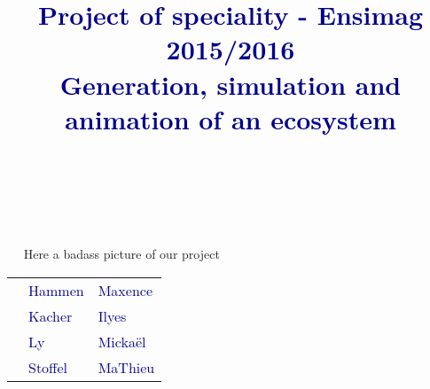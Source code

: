 \documentclass[a4paper,12pt,twoside]{article}
\title{\textbf{{\textcolor{darkblue}{{\Huge Project of speciality - Ensimag 2015/2016}\\[2cm] {\huge Generation, simulation and animation of an ecosystem}}}}}
\author{\large \textbf{{\textcolor{darkblue}{}}}}
\date{\Large \textbf{\textcolor{darkblue}{}}}
\begin{document}
	\begin{spacing}{1.3}%
	\setcounter{page}{1}
	\begin{center}
	~~\\
	\vspace{0cm}
	
	\begin{minipage}{\linewidth}
		\maketitle
	\end{minipage}	
~~\\
	
	\begin{flushright}

	\begin{minipage}{0.5\linewidth}
		~~
		\vspace{5cm}	
		Here a badass picture of our project
	\end{minipage}
	\end{flushright}
	
	\vspace{2cm}
	
	\begin{flushright}
	
	\begin{minipage}{0.5\linewidth}
	\begin{tabular}{|l l l}
		\hspace{0.1cm}&\huge \textcolor{darkblue}{Hammen} & \huge \textcolor{darkblue}{Maxence} \\
		\hspace{0.1cm}&\huge \textcolor{darkblue}{Kacher} & \huge \textcolor{darkblue}{Ilyes} \\
		\hspace{0.1cm}&\huge \textcolor{darkblue}{Ly} & \huge \textcolor{darkblue}{Mickaël} \\
		\hspace{0.1cm}&\huge \textcolor{darkblue}{Stoffel} & \huge \textcolor{darkblue}{MaThieu} \\
	\end{tabular}
	\end{minipage}
	\end{flushright}
	\end{center}
		
	\thispagestyle{empty}
	\newpage
	~~\\
	\thispagestyle{empty}
	\newpage
	~~\\
	\tableofcontents
	\pagestyle{empty}
	\newpage



\end{spacing}
\end{document}
